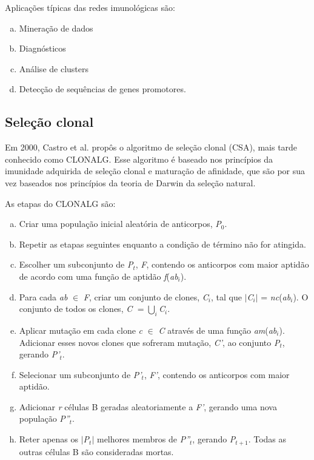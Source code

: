 Aplicações típicas das redes imunológicas são:

\begin{enumerate}[a)]
    \item Mineração de dados
    \item Diagnósticos
    \item Análise de clusters
    \item Detecção de sequências de genes promotores.
\end{enumerate}

\subsection{Seleção clonal}
\label{sec:ais_clonalg}

Em 2000, Castro et al.\cite{Castro2000} propôs o algoritmo de seleção clonal (CSA), mais tarde conhecido como CLONALG. Esse algoritmo é baseado nos princípios da imunidade adquirida de seleção clonal e maturação de afinidade, que são por sua vez baseados nos princípios da teoria de Darwin da seleção natural.

As etapas do CLONALG são:

\begin{enumerate}[a)]
    \item Criar uma população inicial aleatória de anticorpos, \emph{P$_{0}$}.
    \item Repetir as etapas seguintes enquanto a condição de término não for atingida.
    \item Escolher um subconjunto de \emph{P$_{t}$}, \emph{F}, contendo os anticorpos com maior aptidão de acordo com uma função de aptidão \emph{f}(\emph{ab{$_{i}$}}).
    \item Para cada \emph{ab} $\in$ \emph{F}, criar um conjunto de clones, \emph{C$_{i}$}, tal que $|$\emph{C$_{i}$}$|$ = \emph{nc}(\emph{ab$_{i}$}). O conjunto de todos os clones, \emph{C} $= \bigcup_{i}$\emph{C$_{i}$}.
    \item Aplicar mutação em cada clone \emph{c} $\in$ \emph{C} através de uma função \emph{am}(\emph{ab$_{i}$}). Adicionar esses novos clones que sofreram mutação, \emph{C'}, ao conjunto \emph{P$_{t}$}, gerando \emph{P'$_{t}$}.
    \item Selecionar um subconjunto de \emph{P'$_{t}$}, \emph{F'}, contendo os anticorpos com maior aptidão.
    \item Adicionar \emph{r} células B geradas aleatoriamente a \emph{F'}, gerando uma nova população \emph{P''$_{t}$}.
    \item Reter apenas os $|$\emph{P$_{t}$}$|$ melhores membros de \emph{P''$_{t}$}, gerando \emph{P$_{t+1}$}. Todas as outras células B são consideradas mortas.
\end{enumerate}

